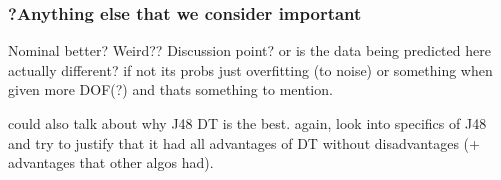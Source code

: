 \subsubsection{?Anything else that we consider important}

Nominal better? Weird?? Discussion point?
or is the data being predicted here actually different? if not its probs just overfitting (to noise) or something when given more DOF(?) and thats something to mention.


could also talk about why J48 DT is the best. again, look into specifics of J48 and try to justify that it had all advantages of DT without disadvantages (+ advantages that other algos had).
